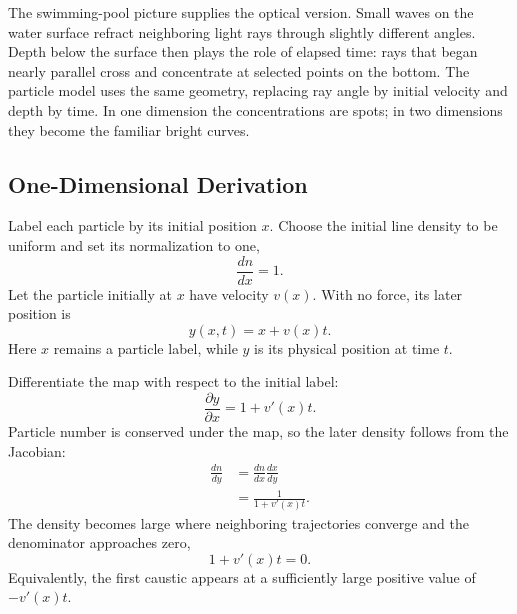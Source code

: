 \begin{classroomqa}
\end{classroomqa}

The swimming-pool picture supplies the optical version. Small waves on the water surface refract neighboring light rays through slightly different angles. Depth below the surface then plays the role of elapsed time: rays that began nearly parallel cross and concentrate at selected points on the bottom. The particle model uses the same geometry, replacing ray angle by initial velocity and depth by time. In one dimension the concentrations are spots; in two dimensions they become the familiar bright curves.

\subsection{One-Dimensional Derivation}

Label each particle by its initial position \(x\). Choose the initial line density to be uniform and set its normalization to one,
\begin{equation}
\frac{dn}{dx}=1.
\label{eq:c09-initial-density}
\end{equation}
Let the particle initially at \(x\) have velocity \(v(x)\). With no force, its later position is
\begin{equation}
y(x,t)=x+v(x)t.
\label{eq:c09-ballistic-map}
\end{equation}
Here \(x\) remains a particle label, while \(y\) is its physical position at time \(t\).

Differentiate the map with respect to the initial label:
\begin{equation}
\frac{\partial y}{\partial x}
=1+v'(x)t.
\label{eq:c09-jacobian}
\end{equation}
Particle number is conserved under the map, so the later density follows from the Jacobian:
\begin{align}
\frac{dn}{dy}
&=
\frac{dn}{dx}\frac{dx}{dy}\\
&=
\frac{1}{1+v'(x)t}.
\label{eq:c09-caustic-density}
\end{align}
The density becomes large where neighboring trajectories converge and the denominator approaches zero,
\begin{equation}
1+v'(x)t=0.
\label{eq:c09-caustic-condition}
\end{equation}
Equivalently, the first caustic appears at a sufficiently large positive value of \(-v'(x)t\).

